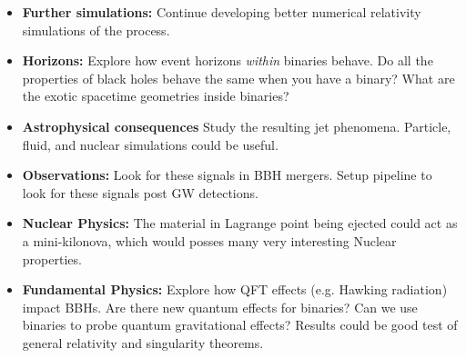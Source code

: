 \begin{itemize}
    \item \textbf{Further simulations:} Continue developing better numerical relativity simulations of the process.
    
    \item \textbf{Horizons:} Explore how event horizons \textit{within} binaries behave. Do all the properties of black holes behave the same when you have a binary? What are the exotic spacetime geometries inside binaries?
    
    \item \textbf{Astrophysical consequences} Study the resulting jet phenomena. Particle, fluid, and nuclear simulations could be useful.
    
    \item \textbf{Observations:} Look for these signals in BBH mergers. Setup pipeline to look for these signals post GW detections.
    
    \item \textbf{Nuclear Physics:} The material in Lagrange point being ejected could act as a mini-kilonova, which would posses many very interesting Nuclear properties.
    
    \item  \textbf{Fundamental Physics:} Explore how QFT effects (e.g. Hawking radiation) impact BBHs. Are there new quantum effects for binaries? Can we use binaries to probe quantum gravitational effects? Results could be good test of general relativity and singularity theorems.

    
\end{itemize}




% 